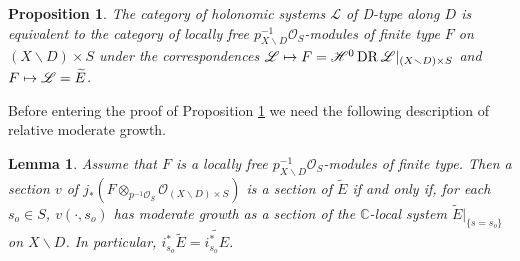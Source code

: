 \documentclass[english]{smfart}
\numberwithin{subsection}{section}
\def\shh{\mathcal{H}}
\def\shh{\mathcal{H}}
\def\shl{\mathcal{L}}
\def\sho{\mathcal{O}}\let\cO\sho
\newcommand{\C}{\mathbb{C}}\let\CC\C
\DeclareMathOperator{\DR}{DR}
\let\tilde\widetilde
\let\setminus\smallsetminus
\newcommand{\pOS}{p^{-1}\sho_S}
\numberwithin{equation}{section}
\theoremstyle{plain}
\newtheorem{proposition}[equation]{Proposition}
\newtheorem{lemma}[equation]{Lemma}
\theoremstyle{definition}
\def\mto{\mathchoice{\longmapsto}{\mapsto}{\mapsto}{\mapsto}}
\begin{document}
\begin{proposition}\label{T:D-T}
The category of holonomic systems $\shl$ of D-type along $D$ is equivalent to the category of locally free $p_{X\setminus D}^{-1}\sho_S$-modules of finite type $F$ on $(X\setminus D)\times S$ under the correspondences $\shl\mto F=\shh^0 \DR\shl|_{(X\setminus D)\times S}$ and $F\mto \shl=\tilde{E}$.
\end{proposition}

Before entering the proof of Proposition \ref{T:D-T} we need the following description of relative moderate growth.

\begin{lemma}\label{fibers}
Assume that $F$ is a locally free $p_{X\setminus D}^{-1}\sho_S$-modules of finite type. Then a section $v$ of \hbox{$j_*(F\otimes_{\pOS}\sho_{(X\setminus D)\times S})$} is a section of $\tilde{E}$ if and only if, for each $s_o\in S$, $v(\cdot,s_o)$ has moderate growth as a section of the $\C$-local system $\tilde{E}|_{\{s=s_o\}}$ on $X\setminus D$. In particular, $i_{s_o}^*\tilde{E}=\tilde{i_{s_o}^*E}$.
\end{lemma}
\end{document}
